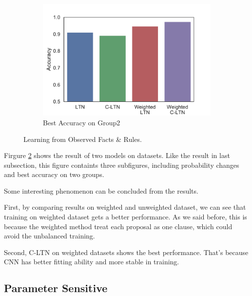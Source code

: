 \begin{figure}[!]
\begin{subfigure}[]{0.33\textwidth}
        \includegraphics[width=\textwidth]{img/bar4.pdf}
        \caption{Best Accuracy on Group2}
        \label{fig:learning-best-accuracy-2}
    \end{subfigure}
    \caption{Learning from Observed Facts \& Rules.}
    \label{fig:learning}
\end{figure}

Firgure \ref{fig:learning} shows the result of two models on datasets. Like the result in last subsection, this figure containts three subfigures, including probability changes and best accuracy on two groups.

Some interesting phenomenon can be concluded from the results.

First, by comparing results on weighted and unweighted dataset, we can see that training on weighted dataset gets a better performance.
As we said before, this is because the weighted method treat each proposal as one clause, which could avoid the unbalanced training.

Second, C-LTN on weighted datasets shows the best performance. That's because CNN has better fitting ability and more stable in training.

\subsection{Parameter Sensitive}

